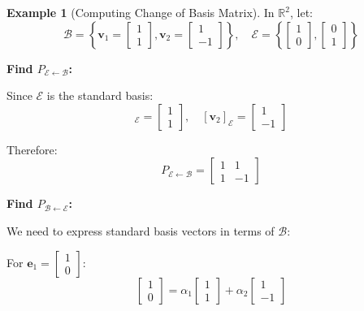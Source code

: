 \documentclass[12pt,a4paper]{article}
\theoremstyle{definition}
\newtheorem{example}{Example}[section]
\begin{document}
\begin{example}[Computing Change of Basis Matrix]
In $\mathbb{R}^2$, let:
\begin{equation}
\mathcal{B} = \left\{\mathbf{v}_1 = \begin{bmatrix} 1 \\ 1 \end{bmatrix}, \mathbf{v}_2 = \begin{bmatrix} 1 \\ -1 \end{bmatrix}\right\}, \quad \mathcal{E} = \left\{\begin{bmatrix} 1 \\ 0 \end{bmatrix}, \begin{bmatrix} 0 \\ 1 \end{bmatrix}\right\}
\end{equation}

\textbf{Find $P_{\mathcal{E} \leftarrow \mathcal{B}}$:}

Since $\mathcal{E}$ is the standard basis:
\begin{equation}
[\mathbf{v}_1]_\mathcal{E} = \begin{bmatrix} 1 \\ 1 \end{bmatrix}, \quad [\mathbf{v}_2]_\mathcal{E} = \begin{bmatrix} 1 \\ -1 \end{bmatrix}
\end{equation}

Therefore:
\begin{equation}
P_{\mathcal{E} \leftarrow \mathcal{B}} = \begin{bmatrix} 1 & 1 \\ 1 & -1 \end{bmatrix}
\end{equation}

\textbf{Find $P_{\mathcal{B} \leftarrow \mathcal{E}}$:}

We need to express standard basis vectors in terms of $\mathcal{B}$:

For $\mathbf{e}_1 = \begin{bmatrix} 1 \\ 0 \end{bmatrix}$:
\begin{equation}
\begin{bmatrix} 1 \\ 0 \end{bmatrix} = \alpha_1\begin{bmatrix} 1 \\ 1 \end{bmatrix} + \alpha_2\begin{bmatrix} 1 \\ -1 \end{bmatrix}
\end{equation}


\end{example}
\end{document}
